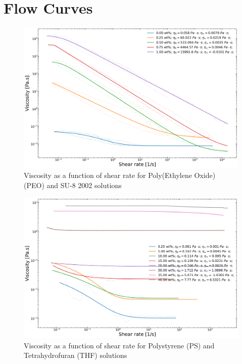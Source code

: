 
\chapter{Flow Curves} %

\label{AppendixX} %

\begin{figure}[!th]
\centering
\includegraphics[width=\textwidth]{./Figures/plt_PEOwtinSU8.png}
\decoRule
\caption[Viscosity as a function of shear rate for Poly(Ethylene Oxide) (PEO) and SU-8 2002 solutions]{Viscosity as a function of shear rate for Poly(Ethylene Oxide) (PEO) and SU-8 2002 solutions}
\label{fig:plt_PEOwtinSU8}
\end{figure}

\begin{figure}[!th]
\centering
\includegraphics[width=\textwidth]{./Figures/plt_PSwtinTHF.png}
\decoRule
\caption[Viscosity as a function of shear rate for Polystyrene (PS) and Tetrahydrofuran (THF) solutions]{Viscosity as a function of shear rate for Polystyrene (PS) and Tetrahydrofuran (THF) solutions}
\label{fig:plt_PSwtinTHF}
\end{figure}

